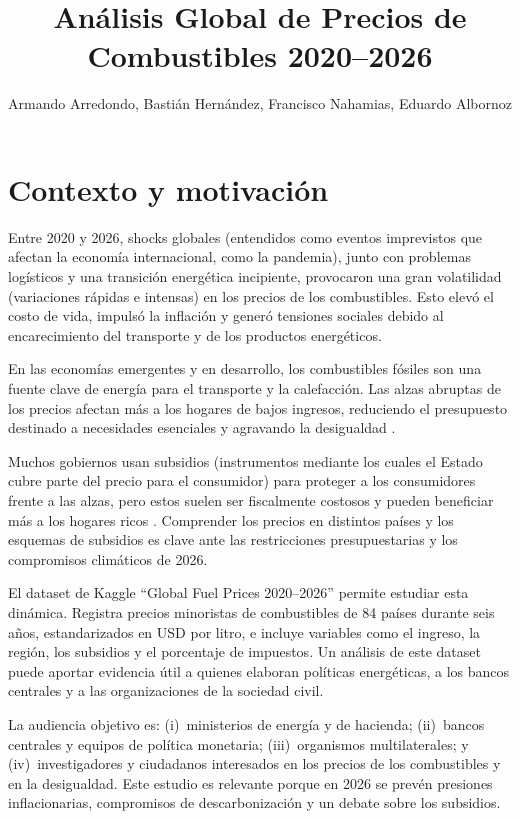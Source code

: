 \documentclass[stu, 12pt, a4paper, biblatex, donotrepeattitle]{apa7}
\title{Análisis Global de Precios de Combustibles 2020--2026}
\author{Armando Arredondo, Bastián Hernández, Francisco Nahamias, Eduardo Albornoz}
\affiliation{Pontificia Universidad Católica de Chile}
\begin{document}
\maketitle

\section{Contexto y motivación}

Entre 2020 y 2026, shocks globales (entendidos como eventos imprevistos que afectan la economía internacional, como la pandemia), junto con problemas logísticos y una transición energética incipiente, provocaron una gran volatilidad (variaciones rápidas e intensas) en los precios de los combustibles. Esto elevó el costo de vida, impulsó la inflación y generó tensiones sociales debido al encarecimiento del transporte y de los productos energéticos.

En las economías emergentes y en desarrollo, los combustibles fósiles son una fuente clave de energía para el transporte y la calefacción. Las alzas abruptas de los precios afectan más a los hogares de bajos ingresos, reduciendo el presupuesto destinado a necesidades esenciales y agravando la desigualdad \parencite{coady2019}.

Muchos gobiernos usan subsidios (instrumentos mediante los cuales el Estado cubre parte del precio para el consumidor) para proteger a los consumidores frente a las alzas, pero estos suelen ser fiscalmente costosos y pueden beneficiar más a los hogares ricos \parencite{parry2021}. Comprender los precios en distintos países y los esquemas de subsidios es clave ante las restricciones presupuestarias y los compromisos climáticos de 2026.

El dataset de Kaggle ``Global Fuel Prices 2020--2026'' permite estudiar esta dinámica. Registra precios minoristas de combustibles de 84 países durante seis años, estandarizados en USD por litro, e incluye variables como el ingreso, la región, los subsidios y el porcentaje de impuestos. Un análisis de este dataset puede aportar evidencia útil a quienes elaboran políticas energéticas, a los bancos centrales y a las organizaciones de la sociedad civil.

La audiencia objetivo es: (i)~ministerios de energía y de hacienda; (ii)~bancos centrales y equipos de política monetaria; (iii)~organismos multilaterales; y (iv)~investigadores y ciudadanos interesados en los precios de los combustibles y en la desigualdad. Este estudio es relevante porque en 2026 se prevén presiones inflacionarias, compromisos de descarbonización y un debate sobre los subsidios.
\end{document}
